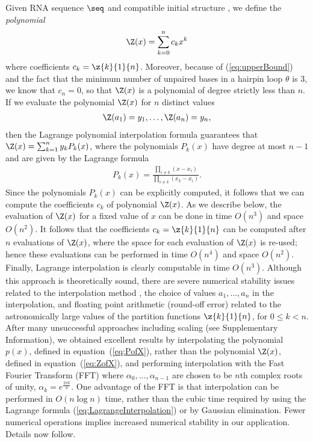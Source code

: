 Given RNA sequence $\seq$ and compatible initial structure \strSt,
we define the {\em polynomial}
\begin{eqnarray}
\label{eq:polynomialYann}
\Z(x) = \sum_{k=0}^n c_k x^k
\end{eqnarray}
where coefficients $c_k=\z{k}{1}{n}$. Moreover, because of
(\ref{eq:upperBound}) and the fact that the minimum number of
unpaired bases in a hairpin loop $\theta$ is $3$, we know that $c_n=0$,
so that $\Z(x)$ is a polynomial of degree strictly less than $n$.
If we evaluate the polynomial $\Z(x)$ for $n$ distinct values
\begin{eqnarray}
\label{eq:ZofX}
\Z(a_1) = y_1,\ldots, \Z(a_{n}) = y_{n},
\end{eqnarray}
then the Lagrange polynomial interpolation formula guarantees that
$\Z(x) = \sum_{k=1}^n y_k P_k(x)$, where the polynomials $P_k(x)$ have degree
at most $n-1$ and are given by the Lagrange formula
\begin{eqnarray}
\label{eq:LagrangeInterpolation}
P_k(x) = \frac{\prod_{i\ne k} (x-x_i)}{\prod_{i \ne k} (x_k-x_i)}.
\end{eqnarray}
Since the polynomials $P_k(x)$ can be explicitly computed, it follows that
we can compute the coefficients $c_k$ of polynomial $\Z(x)$. As we describe
below, the evaluation of $\Z(x)$ for a fixed value of $x$ can be done in
time $O(n^3)$ and space $O(n^2)$.  It follows that the coefficients
$c_k=\z{k}{1}{n}$ can be computed after
$n$ evaluations of $\Z(x)$, where the space for each evaluation of $\Z(x)$
is re-used; hence these evaluations can be performed in time $O(n^4)$ and space
$O(n^2)$. Finally,
Lagrange interpolation is clearly computable in time $O(n^3)$.
Although this approach is theoretically sound, there are severe
numerical stability issues related to the interpolation method
\cite{HighamBarycentricInterpolation},
the choice of values $a_1,\ldots,a_{n}$ in the interpolation,
and floating point arithmetic (round-off error) related to the
astronomically large values of the partition functions
$\z{k}{1}{n}$, for $0 \leq k < n$. After many unsuccessful
approaches including scaling (see Supplementary Information),
we obtained excellent results by
interpolating the polynomial $p(x)$, defined in equation~(\ref{eq:PofX}),
rather than the polynomial $\Z(x)$, defined in equation~(\ref{eq:ZofX}),
and performing interpolation with the Fast Fourier Transform (FFT) \cite{cormen}
where $\alpha_0,\ldots,\alpha_{n-1}$ are
chosen to be $n$th complex roots of unity,
$\alpha_k = e^{\frac{2 \pi k}{n}}$.
One
advantage of the FFT is that interpolation can be performed in $O(n \log n)$
time, rather than the cubic time required by using the Lagrange formula
(\ref{eq:LagrangeInterpolation}) or by Gaussian elimination. Fewer
numerical operations implies increased numerical stability in our application.
Details now follow.

